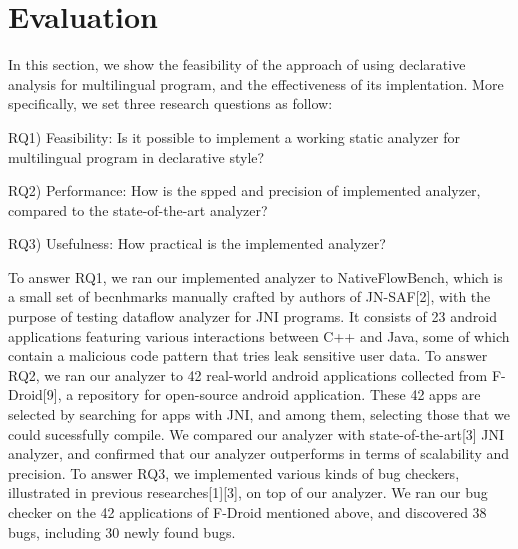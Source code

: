 \section{Evaluation}
In this section, we show the feasibility of the approach of using declarative
analysis for multilingual program, and the effectiveness of its
implentation. More specifically, we set three research questions as follow:

RQ1) Feasibility: Is it possible to implement a working static analyzer for multilingual program in declarative style?

RQ2) Performance: How is the spped and precision of implemented analyzer, compared to the state-of-the-art analyzer?

RQ3) Usefulness: How practical is the implemented analyzer?

To answer RQ1, we ran our implemented analyzer to NativeFlowBench, which is a
small set of becnhmarks manually crafted by authors of JN-SAF[2], with the
purpose of testing dataflow analyzer for JNI programs. It consists of 23
android applications featuring various interactions between C++ and Java, some
of which contain a malicious code pattern that tries leak sensitive user data.
To answer RQ2, we ran our analyzer to 42 real-world android applications
collected from F-Droid[9], a repository for open-source android application. These
42 apps are selected by searching for apps with JNI, and among them, selecting those
that we could sucessfully compile. We compared our analyzer with
state-of-the-art[3] JNI analyzer, and confirmed that our analyzer outperforms
in terms of scalability and precision.  To answer RQ3, we implemented various
kinds of bug checkers, illustrated in previous researches[1][3], on top of our
analyzer. We ran our bug checker on the 42 applications of F-Droid mentioned
above, and discovered 38 bugs, including 30 newly found bugs.


